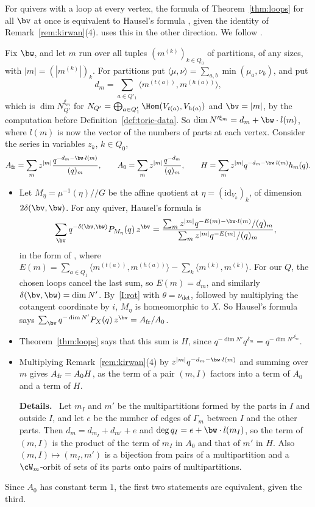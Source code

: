 \documentclass[11pt]{amsart}
\newenvironment{details}{\par\color{black!60!green}\noindent\textbf{Details.}\ }{\par}
\begin{document}
\begin{remark}\label{rem:hausel}
For quivers with a loop at every vertex, the formula of
Theorem~\ref{thm:loops} for all $\bv$ at once is equivalent to Hausel's
formula \cite{hauselBettiNumbers2006}, given the identity of
Remark~\ref{rem:kirwan}(4).   uses this in the other direction.  We
follow \cite[\S3]{nakajimaMultipartitionSpaces2026}.

Fix $\bw$, and let $m$ run over all tuples $(m^{(k)})_{k\in Q_0}$ of
partitions, of any sizes, with $|m|=(|m^{(k)}|)_k$.  For partitions put
$\langle\mu,\nu\rangle=\sum_{a,b}\min(\mu_a,\nu_b)$, and put
\[
 d_m=\sum_{a\in Q'_1}\langle m^{(t(a))},m^{(h(a))}\rangle ,
\]
which is $\dim N_{Q'}^{\xi_m}$ for
$N_{Q'}=\bigoplus_{a\in Q'_1}\Hom(V_{t(a)},V_{h(a)})$ and $\bv=|m|$, by the
computation before Definition~\ref{def:toric-data}.  So $\dim
N'^{\xi_m}=d_m+\bw\cdot l(m)$, where $l(m)$ is now the vector of the numbers of
parts at each vertex.  Consider the series in variables $z_k$, $k\in Q_0$,
\[
 A_{\rm fr}=\sum_m z^{|m|}\frac{q^{-d_m-\bw\cdot l(m)}}{(q)_m},\qquad
 A_0=\sum_m z^{|m|}\frac{q^{-d_m}}{(q)_m},\qquad
 H=\sum_m z^{|m|}q^{-d_m-\bw\cdot l(m)}h_m(q).
\]
\begin{itemize}[leftmargin=2em]
\item Let $M_\eta=\mu^{-1}(\eta)/\!/G$ be the affine quotient at
$\eta=(\mathrm{id}_{V_k})_k$, of dimension $2\delta(\bv,\bw)$.  For any quiver,
Hausel's formula is
\[
 \sum_{\bv}q^{-\delta(\bv,\bw)}P_{M_\eta}(q)\,z^{\bv}
 =\frac{\sum_m z^{|m|}q^{-E(m)-\bw\cdot l(m)}/(q)_m}{\sum_m z^{|m|}q^{-E(m)}/(q)_m},
\]
in the form of , where
$E(m)=\sum_{a\in Q_1}\langle m^{(t(a))},m^{(h(a))}\rangle-\sum_k\langle m^{(k)},m^{(k)}\rangle$.  For our $Q$, the chosen loops cancel the last
sum, so $E(m)=d_m$, and similarly $\delta(\bv,\bw)=\dim N'$.  By~\ref{I:rot}
with $\theta=\nu_{\det}$, followed by multiplying the cotangent coordinate by
$i$, $M_\eta$ is homeomorphic to $X$.  So Hausel's formula says
$\sum_{\bv}q^{-\dim N'}P_X(q)\,z^{\bv}=A_{\rm fr}/A_0$.
\item Theorem~\ref{thm:loops} says that this sum is $H$, since
$q^{-\dim N'}q^{\delta_m}=q^{-\dim N'^{\xi_m}}$.
\item Multiplying Remark~\ref{rem:kirwan}(4) by $z^{|m|}q^{-d_m-\bw\cdot l(m)}$
and summing over $m$ gives $A_{\rm fr}=A_0H$, as the term of a pair $(m,I)$
factors into a term of $A_0$ and a term of $H$.
\begin{details}
Let $m_I$ and $m'$ be
the multipartitions formed by the parts in $I$ and outside $I$, and let $e$
be the number of edges of $\Gamma_m$ between $I$ and the other parts.  Then
$d_m=d_{m_I}+d_{m'}+e$ and $\deg q_I=e+\bw\cdot l(m_I)$, so the term of $(m,I)$
is the product of the term of $m_I$ in $A_0$ and that of $m'$ in $H$.  Also
$(m,I)\mapsto(m_I,m')$ is a bijection from pairs of a multipartition and a
$\cW_m$-orbit of sets of its parts onto pairs of multipartitions.
\end{details}
\end{itemize}
Since $A_0$ has constant term $1$, the first two statements are equivalent,
given the third.


\end{remark}
\end{document}
